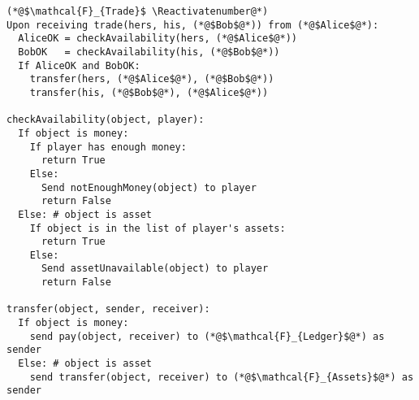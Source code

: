 \Suppressnumber
\begin{lstlisting}[label=tradefunc, style=numbers]
(*@$\mathcal{F}_{Trade}$ \Reactivatenumber@*)
Upon receiving trade(hers, his, (*@$Bob$@*)) from (*@$Alice$@*):
  AliceOK = checkAvailability(hers, (*@$Alice$@*))
  BobOK   = checkAvailability(his, (*@$Bob$@*))
  If AliceOK and BobOK:
    transfer(hers, (*@$Alice$@*), (*@$Bob$@*))
    transfer(his, (*@$Bob$@*), (*@$Alice$@*))

checkAvailability(object, player):
  If object is money:
    If player has enough money:
      return True
    Else:
      Send notEnoughMoney(object) to player
      return False
  Else: # object is asset
    If object is in the list of player's assets:
      return True
    Else:
      Send assetUnavailable(object) to player
      return False

transfer(object, sender, receiver):
  If object is money:
    send pay(object, receiver) to (*@$\mathcal{F}_{Ledger}$@*) as sender
  Else: # object is asset
    send transfer(object, receiver) to (*@$\mathcal{F}_{Assets}$@*) as sender
\end{lstlisting}
